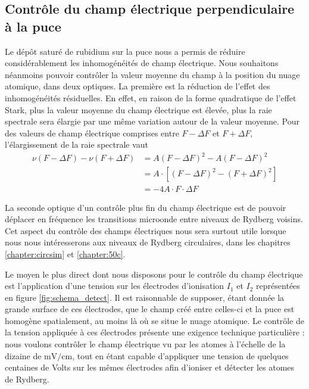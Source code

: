 	\subsection{Contrôle du champ électrique perpendiculaire à la puce}\label{subsec:compensation}
\noindent Le dépôt saturé de rubidium sur la puce nous a permis de réduire considérablement les inhomogénéités de champ électrique.
Nous souhaitons néanmoins pouvoir contrôler la valeur moyenne du champ à la position du nuage atomique, dans deux optiques.
La première est la réduction de l'effet des inhomogénéités résiduelles.
En effet, en raison de la forme quadratique de l'effet Stark, plus la valeur moyenne du champ électrique est élevée, plus la raie spectrale sera élargie par une même variation autour de la valeur moyenne.
Pour des valeurs de champ électrique comprises entre $F-\Delta F$ et $F + \Delta F$, l'élargissement de la raie spectrale vaut
%
\begin{equation}
\label{eq:Stark_broadening}
\begin{aligned}
\nu(F-\Delta F) - \nu(F+\Delta F) &= A (F-\Delta F)^2 - A (F-\Delta F)^2 \\
&= A\cdot [(F-\Delta F)^2 - (F+\Delta F)^2] \\
&= -4A \cdot F\cdot \Delta F
\end{aligned}
\end{equation}

La seconde optique d'un contrôle plus fin du champ électrique est de pouvoir déplacer en fréquence %
les transitions microonde entre niveaux de Rydberg voisins.
Cet aspect du contrôle des champs électriques nous sera surtout utile lorsque nous nous intéresserons aux niveaux de Rydberg circulaires, dans les chapitres \ref{chapter:circsim} et \ref{chapter:50c}.
	
Le moyen le plus direct dont nous disposons pour le contrôle du champ électrique est l'application d'une tension sur les électrodes d'ionisation $I_1$ et $I_2$ représentées en figure \eqref{fig:schema_detect}.
Il est raisonnable de supposer, étant donnée la grande surface de ces électrodes, que le champ créé entre celles-ci et la puce est homogène spatialement, au moins là où se situe le nuage atomique.
Le contrôle de la tension appliquée à ces électrodes présente une exigence technique particulière :
nous voulons contrôler le champ électrique vu par les atomes à l'échelle de la dizaine de $\si{\mV/\cm}$, tout en étant capable d'appliquer une tension de quelques centaines de Volts sur les mêmes électrodes afin d'ioniser et détecter les atomes de Rydberg.

